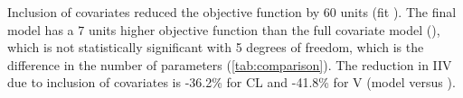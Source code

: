 
Inclusion of covariates reduced the objective function by 60 units (fit ). The final model  has a 7 units higher objective function than the full covariate model (), which is not statistically significant with 5 degrees of freedom, which is the difference in the number of parameters (\cref{tab:comparison}). The reduction in \gls{IIV} due to inclusion of covariates is -36.2\% for \gls{CL} and -41.8\% for \gls{V} (model  versus ). 

          
